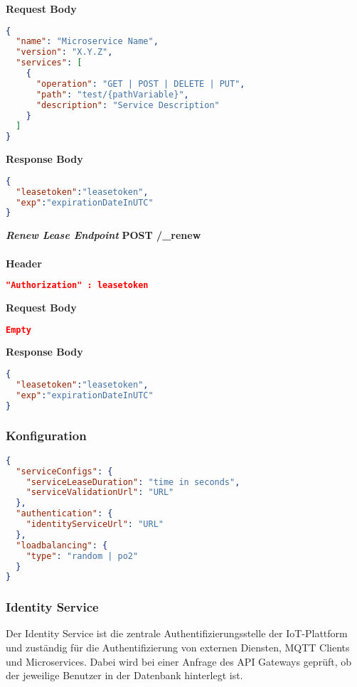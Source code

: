 \textbf{Request Body}
\begin{lstlisting}[language=json,firstnumber=1,basicstyle=\footnotesize]
{
  "name": "Microservice Name",
  "version": "X.Y.Z",
  "services": [
    {
      "operation": "GET | POST | DELETE | PUT",
      "path": "test/{pathVariable}",
      "description": "Service Description"
    }
  ]
}
\end{lstlisting}

\textbf{Response Body}
\begin{lstlisting}[language=json,firstnumber=1,basicstyle=\footnotesize]
{
  "leasetoken":"leasetoken",
  "exp":"expirationDateInUTC"
}
\end{lstlisting} 

\textit{\textbf{Renew Lease Endpoint}}
\newline
\textbf{POST /\_renew} \\\\
\textbf{Header}
\begin{lstlisting}[language=json,firstnumber=1,basicstyle=\footnotesize]
"Authorization" : leasetoken
\end{lstlisting}

\textbf{Request Body}
\begin{lstlisting}[language=json,firstnumber=1,basicstyle=\footnotesize]
Empty
\end{lstlisting}

\textbf{Response Body}
\begin{lstlisting}[language=json,firstnumber=1,basicstyle=\footnotesize]
{
  "leasetoken":"leasetoken",
  "exp":"expirationDateInUTC"
}
\end{lstlisting}

\subsubsection{Konfiguration}
\begin{lstlisting}[language=json,firstnumber=1,basicstyle=\footnotesize]
{
  "serviceConfigs": {
    "serviceLeaseDuration": "time in seconds",
    "serviceValidationUrl": "URL"
  },
  "authentication": {
    "identityServiceUrl": "URL"
  },
  "loadbalancing": {
    "type": "random | po2"
  }
}
\end{lstlisting}

\subsubsection{Identity Service}
\label{sec:arch:iot:is}
Der Identity Service ist die zentrale Authentifizierungsstelle der IoT-Plattform und zuständig für die Authentifizierung von externen Diensten, MQTT Clients und Microservices.
Dabei wird bei einer Anfrage des API Gateways geprüft, ob der jeweilige Benutzer in der Datenbank hinterlegt ist.


